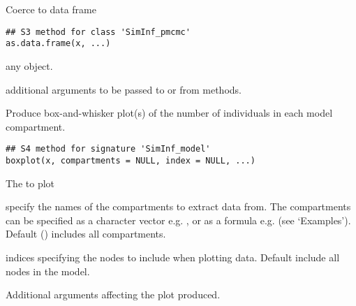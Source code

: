 \documentclass[letterpaper]{book}
\begin{document}
%
\begin{Description}
Coerce to data frame
\end{Description}
%
\begin{Usage}
\begin{verbatim}
## S3 method for class 'SimInf_pmcmc'
as.data.frame(x, ...)
\end{verbatim}
\end{Usage}
%
\begin{Arguments}
\begin{ldescription}
\item[\code{x}] any \R{} object.

\item[\code{...}] additional arguments to be passed to or from methods.
\end{ldescription}
\end{Arguments}
%
\begin{Description}
Produce box-and-whisker plot(s) of the number of individuals in
each model compartment.
\end{Description}
%
\begin{Usage}
\begin{verbatim}
## S4 method for signature 'SimInf_model'
boxplot(x, compartments = NULL, index = NULL, ...)
\end{verbatim}
\end{Usage}
%
\begin{Arguments}
\begin{ldescription}
\item[\code{x}] The  to plot

\item[\code{compartments}] specify the names of the compartments to
extract data from. The compartments can be specified as a
character vector e.g. ,
or as a formula e.g.  (see
`Examples'). Default ()
includes all compartments.

\item[\code{index}] indices specifying the nodes to include when plotting
data. Default  include all nodes in the
model.

\item[\code{...}] Additional arguments affecting the plot produced.
\end{ldescription}
\end{Arguments}
\end{document}
